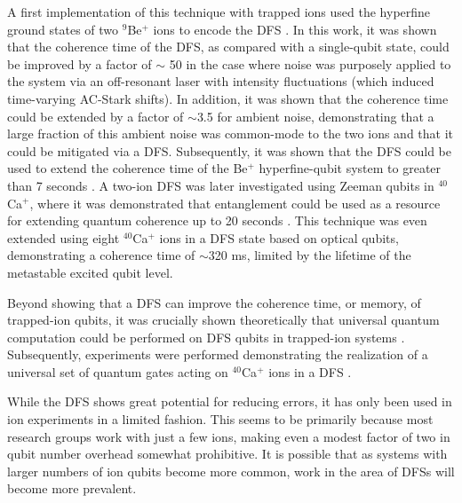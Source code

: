 \documentclass[%
12pt,
 amsmath,amssymb,
]{revtex4-2}
\begin{document}
A first implementation of this technique with trapped ions used the hyperfine ground states of two $^9$Be$^+$ ions to encode the DFS \cite{KielpinskiDFS1013}.  In this work, it was shown that the coherence time of the DFS, as compared with a single-qubit state, could be improved by a factor of $\sim$ 50 in the case where noise was purposely applied to the system via an off-resonant laser with intensity fluctuations (which induced time-varying AC-Stark shifts).  In addition, it was shown that the coherence time could be extended by a factor of $\sim$3.5 for ambient noise, demonstrating that a large fraction of this ambient noise was common-mode to the two ions and that it could be mitigated via a DFS. Subsequently, it was shown that the DFS could be used to extend the coherence time of the Be$^+$ hyperfine-qubit system to greater than 7 seconds \cite{langer2005long}. A two-ion DFS was later investigated using Zeeman qubits in $^{40}$Ca$^+$, where it was demonstrated that entanglement could be used as a resource for extending quantum coherence up to 20 seconds \cite{HaeffnerRobustEntanglement2005}.  This technique was even extended using eight $^{40}$Ca$^+$ ions in a DFS state based on optical qubits, demonstrating a coherence time of $\sim$320 ms, limited by the lifetime of the metastable excited qubit level.

Beyond showing that a DFS can improve the coherence time, or memory, of trapped-ion qubits, it was crucially shown theoretically that universal quantum computation could be performed on DFS qubits in trapped-ion systems \cite{AolitaDFS2007, CenDFS2006}.  Subsequently, experiments were performed demonstrating the realization of a universal set of quantum gates acting on $^{40}$Ca$^+$ ions in a DFS \cite{MonzDFSGates2009}.

While the DFS shows great potential for reducing errors, it has only been used in ion experiments in a limited fashion.  This seems to be primarily because most research groups work with just a few ions, making even a modest factor of two in qubit number overhead somewhat prohibitive.  It is possible that as systems with larger numbers of ion qubits become more common, work in the area of DFSs will become more prevalent.
\end{document}
